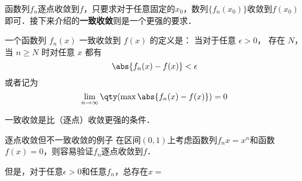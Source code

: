 
\begin{issues}
\issueDraft
\end{issues}


函数列$f_n$逐点收敛到$f$，只要求对于任意固定的$x_0$，数列$\{f_n(x_0)\}$收敛到$f(x_0)$即可．接下来介绍的\textbf{一致收敛}则是一个更强的要求．

一个函数列 $f_n(x)$ 一致收敛到 $f(x)$ 的定义是： 当对于任意 $\epsilon > 0$， 存在 $N$， 当 $n \geqslant N$ 时对任意 $x$ 都有
\begin{equation}
\abs{f_n(x) - f(x)} < \epsilon
\end{equation}
或者记为
\begin{equation}
\lim_{n\to\infty} \qty(\max \abs{f_n(x) - f(x)}) = 0
\end{equation}

一致收敛是比（逐点）收敛更强的条件．

\begin{example}{逐点收敛但不一致收敛的例子}
在区间$(0, 1)$上考虑函数列$f_n{x}=x^n$和函数$f(x)=0$，则容易验证$f_n$逐点收敛到$f$．

但是，对于任意$\epsilon>0$和任意$f_n$，总存在$x=$

\end{example}










